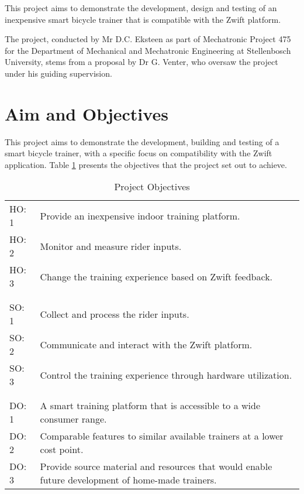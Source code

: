 This project aims to demonstrate the development, design and testing of an inexpensive smart bicycle trainer that is compatible with the Zwift platform.

The project, conducted by Mr D.C. Eksteen as part of Mechatronic Project 475 for the Department of Mechanical and Mechatronic Engineering at Stellenbosch University, stems from a proposal by Dr G. Venter, who oversaw the project under his guiding supervision.

\section{Aim and Objectives}

This project aims to demonstrate the development, building and testing of a smart bicycle trainer, with a specific focus on compatibility with the Zwift application. Table \ref{tab:obj} presents the objectives that the project set out to achieve.

\begin{table}[H]
	\centering
	\caption{Project Objectives}
	\begin{tabularx}{\textwidth}{>{\centering}p{1.5cm} X}
		\toprule
		\multicolumn{2}{c}{Hardware Objectives}                                       \\
		\midrule
		HO: 1 & Provide an inexpensive indoor training platform.                       \\
		HO: 2 & Monitor and measure rider inputs.                                      \\
		HO: 3 & Change the training experience based on Zwift feedback.                \\
		      &                                                                       \\
		\toprule
		\multicolumn{2}{c}{Software Objectives}                                       \\
		\midrule
		SO: 1 & Collect and process the rider inputs.                                  \\
		SO: 2 & Communicate and interact with the Zwift platform.                          \\
		SO: 3 & Control the training experience through hardware utilization.          \\
		      &                                                                       \\
		\toprule
		\multicolumn{2}{c}{Final Deliverable Objectives}                              \\
		\midrule
		DO: 1 & A smart training platform that is accessible to a wide consumer range.   \\
		DO: 2 & Comparable features to similar available trainers at a lower cost point. \\
		DO: 3 & Provide source material and resources that would enable future development of home-made trainers.\\
		\bottomrule
	\end{tabularx}
	\label{tab:obj}
\end{table}

